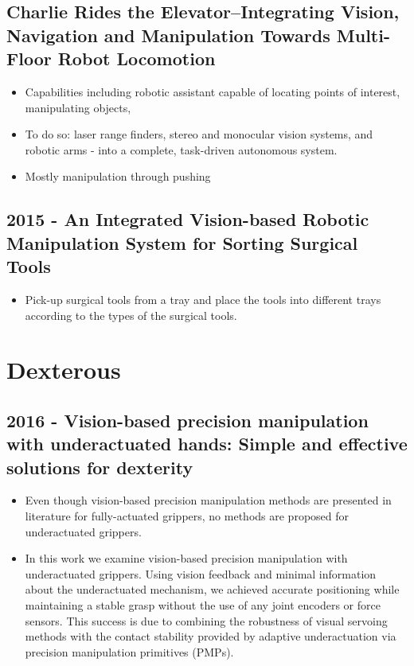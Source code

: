 \subsection{Charlie Rides the Elevator–Integrating Vision, Navigation and Manipulation Towards Multi-Floor Robot Locomotion}
\begin{itemize}
\item Capabilities including  robotic assistant capable of locating points of interest, manipulating objects,
\item To do so: laser range finders, stereo and monocular vision systems, and robotic arms - into a complete, task-driven autonomous system.
\item Mostly manipulation through pushing
\end{itemize}

\subsection{2015 - An Integrated Vision-based Robotic Manipulation System for Sorting Surgical Tools}
\begin{itemize}
\item Pick-up surgical tools from a tray and place the tools into different trays according to the types of the surgical tools.  
\end{itemize}



\section{Dexterous}
\subsection{2016 - Vision-based precision manipulation with underactuated hands: Simple and effective solutions for dexterity}
\begin{itemize}
\item Even though vision-based precision manipulation methods are presented in literature for fully-actuated grippers, no methods are proposed for underactuated grippers.
\item In this work we examine vision-based precision manipulation with underactuated grippers. Using vision feedback and minimal information about the underactuated mechanism, we achieved accurate positioning while maintaining a stable grasp without the use of any joint encoders or force sensors. This success is due to combining the robustness of visual servoing methods with the contact stability provided by adaptive underactuation via precision manipulation primitives (PMPs).
\end{itemize}

